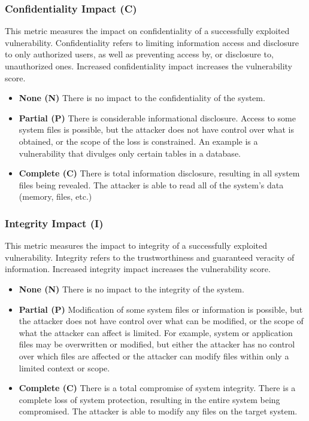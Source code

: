   \subsubsection{Confidentiality Impact
  (C)}\label{confidentiality-impact-c}

  This metric measures the impact on confidentiality of a successfully
  exploited vulnerability. Confidentiality refers to limiting information
  access and disclosure to only authorized users, as well as preventing
  access by, or disclosure to, unauthorized ones. Increased
  confidentiality impact increases the vulnerability score.

  \begin{itemize}
  \item
    \textbf{None (N)} There is no impact to the confidentiality of the
    system.
  \item
    \textbf{Partial (P)} There is considerable informational disclosure.
    Access to some system files is possible, but the attacker does not
    have control over what is obtained, or the scope of the loss is
    constrained. An example is a vulnerability that divulges only certain
    tables in a database.
  \item
    \textbf{Complete (C)} There is total information disclosure, resulting
    in all system files being revealed. The attacker is able to read all
    of the system's data (memory, files, etc.)
  \end{itemize}

  \subsubsection{Integrity Impact (I)}\label{integrity-impact-i}

  This metric measures the impact to integrity of a successfully exploited
  vulnerability. Integrity refers to the trustworthiness and guaranteed
  veracity of information. Increased integrity impact increases the
  vulnerability score.

  \begin{itemize}
  \item
    \textbf{None (N)} There is no impact to the integrity of the system.
  \item
    \textbf{Partial (P)} Modification of some system files or information
    is possible, but the attacker does not have control over what can be
    modified, or the scope of what the attacker can affect is limited. For
    example, system or application files may be overwritten or modified,
    but either the attacker has no control over which files are affected
    or the attacker can modify files within only a limited context or
    scope.
  \item
    \textbf{Complete (C)} There is a total compromise of system integrity.
    There is a complete loss of system protection, resulting in the entire
    system being compromised. The attacker is able to modify any files on
    the target system.
  \end{itemize}

